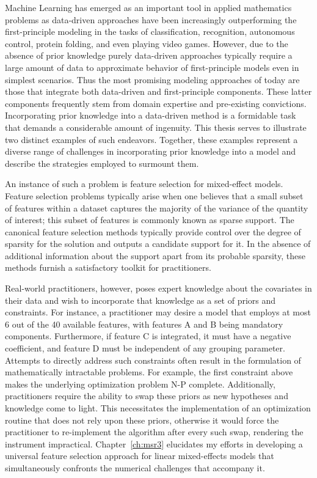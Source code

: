 Machine Learning has emerged as an important tool in applied mathematics problems as data-driven approaches have been increasingly outperforming the first-principle modeling in the tasks of classification, recognition, autonomous control, protein folding, and even playing video games. However, due to the absence of prior knowledge  purely data-driven approaches typically require a large amount of data to approximate behavior of first-principle models even in simplest scenarios. Thus the most promising modeling approaches of today are those that integrate both data-driven and first-principle components. These latter components frequently stem from domain expertise and pre-existing convictions. Incorporating prior knowledge into a data-driven method is a formidable task that demands a considerable amount of ingenuity. This thesis serves to illustrate two distinct examples of such endeavors.  Together, these examples represent a diverse range of challenges in incorporating prior knowledge into a model and describe the strategies employed to surmount them.

An instance of such a problem is feature selection for mixed-effect models. Feature selection problems typically arise when one believes that a small subset of features within a dataset captures the majority of the variance of the quantity of interest; this subset of features is commonly known as sparse support. The canonical feature selection methods typically provide control over the degree of sparsity for the solution and outputs a candidate support for it. In the absence of additional information about the support apart from its probable sparsity, these methods furnish a satisfactory toolkit for practitioners.

 Real-world practitioners, however, poses expert knowledge about the covariates in their data and wish to incorporate that knowledge as a set of priors and constraints. For instance, a practitioner may desire a model that employs at most 6 out of the 40 available features, with features A and B being mandatory components. Furthermore, if feature C is integrated, it must have a negative coefficient, and feature D must be independent of any grouping parameter. Attempts to directly address such constraints often result in the formulation of mathematically intractable problems. For example, the first constraint above makes the underlying optimization problem N-P complete. Additionally, practitioners require the ability to swap these priors as new hypotheses and knowledge come to light. This necessitates the implementation of an optimization routine that does not rely upon these priors, otherwise it would force the practitioner to re-implement the algorithm after every such swap, rendering the instrument impractical. Chapter~\ref{ch:msr3} elucidates my efforts in developing a universal feature selection approach for linear mixed-effects models that simultaneously confronts the numerical challenges that accompany it.

